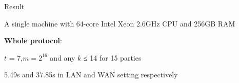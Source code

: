 \begin{frame}{Result}



    \vspace{0.25cm}

    A single machine with 64-core Intel Xeon 2.6GHz CPU and 256GB RAM

    \vspace{0.25cm}


    \vspace{0.5cm}


    \begin{flushleft}
        \textbf{Whole protocol}:
        
        $t$ = 7,$m=2^{16}$ and any $k$ ≤ 14 for 15 parties
    
        5.49s and 37.85s in LAN and WAN setting respectively
    \end{flushleft}

\end{frame}